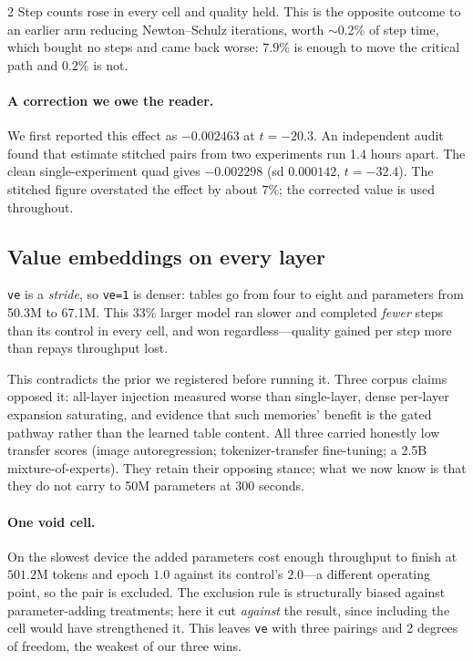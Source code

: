 \documentclass[10pt]{article}
\begin{document}
\begin{multicols}{2}
Step counts rose in every cell and quality held. This is the opposite outcome to an
earlier arm reducing Newton--Schulz iterations, worth $\sim$0.2\% of step time, which
bought no steps and came back worse: $7.9\%$ is enough to move the critical path and
$0.2\%$ is not.

\paragraph{A correction we owe the reader.} We first reported this effect as $-0.002463$
at $t=-20.3$. An independent audit found that estimate stitched pairs from two experiments
run 1.4 hours apart. The clean single-experiment quad gives $-0.002298$ (sd $0.000142$,
$t=-32.4$). The stitched figure overstated the effect by about $7\%$; the corrected value
is used throughout.

\subsection{Value embeddings on every layer}

\texttt{ve} is a \emph{stride}, so \texttt{ve=1} is denser: tables go from four to eight
and parameters from 50.3M to 67.1M. This 33\% larger model ran slower and completed
\emph{fewer} steps than its control in every cell, and won regardless---quality gained per
step more than repays throughput lost.

This contradicts the prior we registered before running it. Three corpus claims opposed
it: all-layer injection measured worse than single-layer, dense per-layer expansion
saturating, and evidence that such memories' benefit is the gated pathway rather than the
learned table content. All three carried honestly low transfer scores (image
autoregression; tokenizer-transfer fine-tuning; a 2.5B mixture-of-experts). They retain
their opposing stance; what we now know is that they do not carry to 50M parameters at 300
seconds.

\paragraph{One void cell.} On the slowest device the added parameters cost enough
throughput to finish at $501.2$M tokens and epoch $1.0$ against its control's $2.0$---a
different operating point, so the pair is excluded. The exclusion rule is structurally
biased against parameter-adding treatments; here it cut \emph{against} the result, since
including the cell would have strengthened it. This leaves \texttt{ve} with three pairings
and 2 degrees of freedom, the weakest of our three wins.


\end{multicols}
\end{document}
